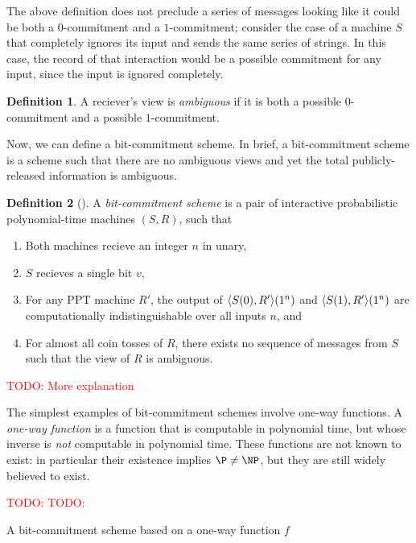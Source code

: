 \documentclass[english,12pt]{reedthesis}
\theoremstyle{plain}
\theoremstyle{definition}
\newtheorem{defn}[defn]{Definition}
\theoremstyle{remark}
\DeclarePairedDelimiter{\ang}{\langle}{\rangle}
\newcommand{\TODO}[1]{\textcolor{red}{TODO: #1}}
\begin{document}
The above definition does not preclude a series of messages looking like it
could be both a $0$-commitment and a $1$-commitment; consider the case of a
machine $S$ that completely ignores its input and sends the same series of
strings. In this case, the record of that interaction would be a possible
commitment for any input, since the input is ignored completely.

\begin{defn}\label{def:ambiguous-view}
  A reciever's view is \emph{ambiguous} if it is both a possible $0$-commitment
  and a possible $1$-commitment.
\end{defn}

Now, we can define a bit-commitment scheme. In brief, a bit-commitment scheme is
a scheme such that there are no ambiguous views and yet the total
publicly-released information is ambiguous.

\begin{defn}[{\cite[Def.\ 4.4.1]{Go01}}]\label{def:commitment-scheme}
  A \emph{bit-commitment scheme} is a pair of interactive probabilistic
  polynomial-time machines $(S, R)$, such that
  \begin{enumerate}
    \item Both machines recieve an integer $n$ in unary,
    \item $S$ recieves a single bit $v$,
    \item For any PPT machine $R'$, the output of $\ang{S(0), R'}(1^{n})$ and
          $\ang{S(1), R'}(1^{n})$ are computationally indistinguishable over all
          inputs $n$, and
    \item For almost all coin tosses of $R$, there exists no sequence of
          messages from $S$ such that the view of $R$ is ambiguous.
  \end{enumerate}
\end{defn}

\TODO{More explanation}

The simplest examples of bit-commitment schemes involve one-way
functions. A \emph{one-way function} is a function that
is computable in polynomial time, but whose inverse is \emph{not} computable in
polynomial time. These functions are not known to exist: in particular their
existence implies $\P \ne \NP$, but they are still widely believed to exist.

\begin{algorithm}[htbp]
  \TODO{}\;
  \TODO{}\;
  \caption{A bit-commitment scheme based on a one-way function
    $f$}\label{alg:bit-commit}
\end{algorithm}
\end{document}
